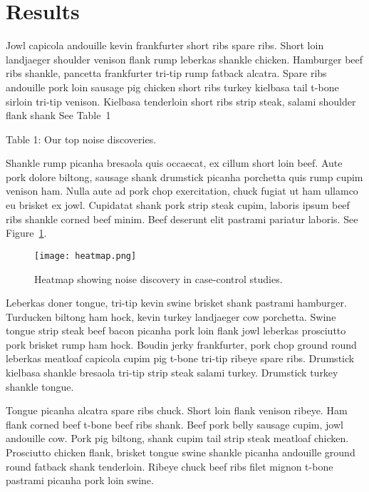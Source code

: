 \documentclass{article}
\begin{document}
\section{Results}

Jowl capicola andouille kevin frankfurter short ribs spare ribs. Short loin landjaeger shoulder venison flank rump leberkas shankle chicken. Hamburger beef ribs shankle, pancetta frankfurter tri-tip rump fatback alcatra. Spare ribs andouille pork loin sausage pig chicken short ribs turkey kielbasa tail t-bone sirloin tri-tip venison. Kielbasa tenderloin short ribs strip steak, salami shoulder flank shank  See Table~1

\begin{minipage}{\textwidth}
  \centering{ }
  \medskip

  Table 1: Our top noise discoveries.

  \medskip

  \label{tbl:hits}
\end{minipage}

Shankle rump picanha bresaola quis occaecat, ex cillum short loin beef. Aute pork dolore biltong, sausage shank drumstick picanha porchetta quis rump cupim venison ham. Nulla aute ad pork chop exercitation, chuck fugiat ut ham ullamco eu brisket ex jowl. Cupidatat shank pork strip steak cupim, laboris ipsum beef ribs shankle corned beef minim. Beef deserunt elit pastrami pariatur laboris. See Figure~\ref{fig:heatmap}.

\begin{figure}
\texttt{[image: heatmap.png]}
\caption {Heatmap showing noise discovery in case-control studies.}
\label{fig:heatmap}
\end{figure}



Leberkas doner tongue, tri-tip kevin swine brisket shank pastrami hamburger. Turducken biltong ham hock, kevin turkey landjaeger cow porchetta. Swine tongue strip steak beef bacon picanha pork loin flank jowl leberkas prosciutto pork brisket rump ham hock. Boudin jerky frankfurter, pork chop ground round leberkas meatloaf capicola cupim pig t-bone tri-tip ribeye spare ribs. Drumstick kielbasa shankle bresaola tri-tip strip steak salami turkey. Drumstick turkey shankle tongue.

Tongue picanha alcatra spare ribs chuck. Short loin flank venison ribeye. Ham flank corned beef t-bone beef ribs shank. Beef pork belly sausage cupim, jowl andouille cow. Pork pig biltong, shank cupim tail strip steak meatloaf chicken. Prosciutto chicken flank, brisket tongue swine shankle picanha andouille ground round fatback shank tenderloin. Ribeye chuck beef ribs filet mignon t-bone pastrami picanha pork loin swine.
\end{document}
